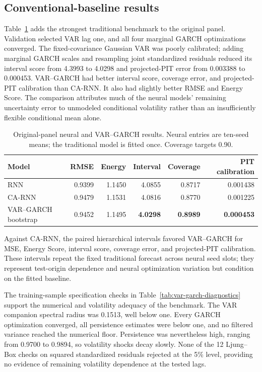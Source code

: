 \documentclass[11pt]{article}
\begin{document}
\subsection{Conventional-baseline results}

Table~\ref{tab:baseline-results} adds the strongest traditional benchmark to the
original panel. Validation selected VAR lag one, and all four marginal GARCH
optimizations converged. The fixed-covariance Gaussian VAR was poorly calibrated;
adding marginal GARCH scales and resampling joint standardized residuals reduced
its interval score from 4.3993 to 4.0298 and projected-PIT error from 0.003388 to
0.000453. VAR--GARCH had better interval score, coverage error, and projected-PIT
calibration than CA-RNN. It also had slightly better RMSE and Energy
Score. The comparison attributes much of the neural models' remaining uncertainty
error to unmodeled conditional volatility rather than an insufficiently flexible
conditional mean alone.

\begin{table}[ht]
\centering
\caption{Original-panel neural and VAR--GARCH results. Neural entries are
ten-seed means; the traditional model is fitted once. Coverage targets 0.90.}
\label{tab:baseline-results}
\begin{tabular}{lrrrrr}
\toprule
Model & RMSE & Energy & Interval & Coverage & PIT calibration \\
\midrule
RNN & 0.9399 & 1.1450 & 4.0855 & 0.8717 & 0.001438 \\
CA-RNN & 0.9479 & 1.1531 & 4.0816 & 0.8770 & 0.001225 \\
VAR--GARCH bootstrap & 0.9452 & 1.1495 & \textbf{4.0298} & \textbf{0.8989} & \textbf{0.000453} \\
\bottomrule
\end{tabular}
\end{table}

Against CA-RNN, the paired hierarchical intervals favored
VAR--GARCH for MSE, Energy Score, interval score, coverage error, and projected-PIT
calibration. These intervals repeat the fixed traditional forecast across neural
seed slots; they represent test-origin dependence and neural optimization
variation but condition on the fitted baseline.

The training-sample specification checks in
Table~\ref{tab:var-garch-diagnostics} support the numerical and volatility
adequacy of the benchmark. The VAR companion spectral radius was 0.1513, well
below one. Every GARCH optimization converged, all persistence estimates were
below one, and no filtered variance reached the numerical floor. Persistence was
nevertheless high, ranging from 0.9700 to 0.9894, so volatility shocks decay
slowly. None of the 12 Ljung--Box checks on squared standardized residuals
rejected at the 5\% level, providing no evidence of remaining volatility
dependence at the tested lags.
\end{document}
